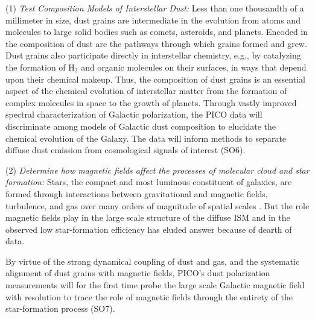 \documentclass[PICOReport.tex]{subfiles}
\begin{document}
(1) {\em Test Composition Models of Interstellar Dust:} 
Less than one thousandth of a millimeter in size, dust grains are intermediate in the evolution from atoms and molecules to large solid bodies such as comets, asteroids, and planets. Encoded in the composition of dust are the pathways through which grains formed and grew. Dust grains also participate directly in interstellar chemistry, e.g., by catalyzing the formation of H$_2$ and organic molecules on their surfaces, in ways that depend upon their chemical makeup. Thus, the composition of dust grains is an essential aspect of the chemical evolution of interstellar matter from the formation of complex molecules in space to the growth of planets. Through vastly improved spectral characterization of Galactic polarization, the PICO data will discriminate among models of Galactic dust composition to elucidate the chemical evolution of the Galaxy. The data will inform methods to separate diffuse dust emission from cosmological signals of interest (SO6). %


(2) {\em Determine how magnetic fields affect the processes of molecular cloud and star formation:}
Stars, the compact and most luminous constituent of galaxies, are formed through interactions between gravitational and magnetic fields, turbulence, and gas over many orders of magnitude of spatial scales . But the role magnetic fields play in the large scale structure of the diffuse \ac{ISM} and in the observed low star-formation efficiency has eluded answer because of dearth of data. 

By virtue of the strong dynamical coupling of dust and gas, and the systematic alignment of dust grains with magnetic fields, PICO's dust polarization measurements will for the first time probe the large scale Galactic magnetic field with resolution to trace the role of magnetic fields through the entirety of the star-formation process (SO7). 

\end{document}
